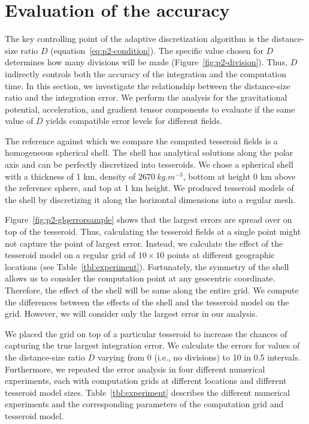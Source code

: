 \section{Evaluation of the accuracy}



The key controlling point of the adaptive discretization algorithm
is the distance-size ratio $D$ (equation~\ref{eq:p2-condition}).
The specific value chosen for $D$ determines how many divisions will be made
(Figure~\ref{fig:p2-division}).
Thus, $D$ indirectly controls both the accuracy of the integration
and the computation time.
In this section, we investigate the relationship between
the distance-size ratio and the integration error.
We perform the analysis for the gravitational potential,
acceleration, and gradient tensor components
to evaluate if the same value of $D$ yields compatible error levels
for different fields.

The reference against which we compare the computed tesseroid fields
is a homogeneous spherical shell.
The shell has analytical solutions along the polar axis
\citep{lafehr1991a, mikuska2006, grombein2013}
and can be perfectly discretized into tesseroids.
We chose a spherical shell with a thickness of 1 km,
density of $2670\ kg.m^{-3}$,
bottom at height 0 km above the reference sphere,
and top at 1 km height.
We produced tesseroid models of the shell by discretizing it along the
horizontal dimensions into a regular mesh.


Figure~\ref{fig:p2-glqerrorsample} shows that the largest errors are spread over
on top of the tesseroid.
Thus, calculating the tesseroid fields at a single point might not
capture the point of largest error.
Instead, we calculate the effect of the tesseroid model on a regular grid
of $10 \times 10$ points at different geographic locations
(see Table~\ref{tbl:experiment}).
Fortunately, the symmetry of the shell allows us to consider the computation
point at any geocentric coordinate.
Therefore, the effect of the shell will be same along the entire grid.
We compute the differences between the effects of the shell and the tesseroid
model on the grid.
However, we will consider only the largest error in our analysis.


We placed the grid on top of a particular tesseroid
to increase the chances of capturing the true largest integration error.
We calculate the errors for values of the distance-size ratio
$D$ varying from 0 (i.e., no divisions) to 10 in 0.5 intervals.
Furthermore, we repeated the error analysis in four different numerical experiments,
each with computation grids at different locations and
different tesseroid model sizes.
Table~\ref{tbl:experiment} describes the different numerical
experiments and the corresponding parameters of the computation grid and
tesseroid model.


